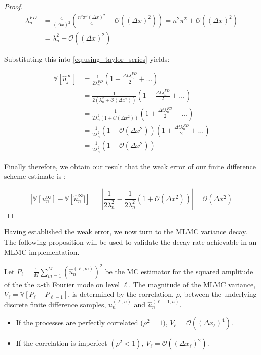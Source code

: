 \begin{proof}
\begin{align*}
    \lambda_n^{FD} &= \frac{4}{(\Delta x)^2}\left(\frac{n^2 
    \pi^2 (\Delta x)^2}{4} + \mathcal{O}((\Delta x)^2)\right) = 
    n^2\pi^2 + \mathcal{O}((\Delta x)^2) \\
    &= \lambda_n^2 + \mathcal{O}((\Delta x)^2)
\end{align*}

Substituting this into \eqref{eq:using_taylor_series} yields:

\begin{align*}
    \mathbb{V}[\hat{u}_j^\infty] &= 
    \frac{1}{2\lambda_n^{FD}}\left(1 + 
    \frac{\Delta t \lambda_n^{FD}}{2} + \dots\right) \\
    &= \frac{1}{2\left(\lambda_n^2 + \mathcal{O}(\Delta x^2)\right)}\left(1 + \frac{\Delta t \lambda_n^{FD}}{2} + \dots\right) \\
    &= \frac{1}{2 \lambda_n^2 \left(1 + \mathcal{O}(\Delta x^2)\right)}\left(1 + \frac{\Delta t \lambda_n^{FD}}{2} + \dots\right) \\
    &= \frac{1}{2 \lambda_n^2}\left(1 + \mathcal{O}(\Delta x^2)\right)\left(1 + \frac{\Delta t \lambda_n^{FD}}{2} + \dots\right) \\
    &= \frac{1}{2 \lambda_n^2}\left(1 + \mathcal{O}(\Delta x^2)\right)
    \label{eq:final_result}
\end{align*}

Finally therefore, we obtain our result that the weak error
of our finite difference scheme estimate is :

\begin{equation*}
    |\mathbb{V}\left[u_n^\infty\right] - \mathbb{V}\left[\hat{u}_n^\infty]\right]| = |\frac{1}{2\lambda_n^2} - \frac{1}{2 \lambda_n^2}\left(1 + \mathcal{O}(\Delta x^2)\right)|
    = \mathcal{O}(\Delta x^2)
\end{equation*}
\end{proof}


Having established the weak error, we now turn to the MLMC variance decay. 
The following proposition will be used to validate the decay 
rate achievable in an MLMC implementation.

\begin{proposition}
    \label{prop:variance_decay_fourier}
    Let $P_\ell = \frac{1}{M}\sum_{m=1}^M(\hat{u}_n^{(\ell,m)})^2$ 
    be the MC estimator for the squared amplitude 
    of the the $n$-th Fourier mode on level $\ell$. The magnitude of 
    the MLMC 
    variance, $V_\ell = \mathbb{V}[P_\ell - P_{\ell - 1}]$, is 
    determined by the correlation, $\rho$, between the underlying 
    discrete finite difference samples, 
    $\hat{u}_n^{(\ell, n)}$ and $\hat{u}_n^{(\ell-1, n)}$.
    \begin{itemize}
        \item If the processes are perfectly correlated ($\rho^2 = 1)$,
         $V_\ell = \mathcal{O}((\Delta x_\ell)^4)$.
        \item If the correlation is imperfect $(\rho^2 < 1)$, 
        $V_\ell = \mathcal{O}((\Delta x_\ell)^2)$.
    \end{itemize}
\end{proposition}

